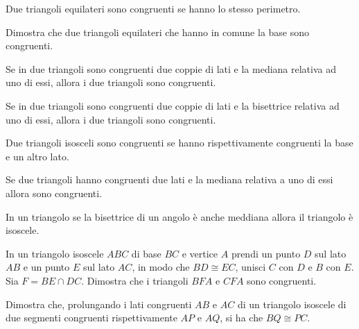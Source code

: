 \begin{multicols}{2}
\begin{esercizio}
\label{ese:2.56}
Due triangoli equilateri sono congruenti se hanno lo stesso perimetro.
\end{esercizio}

\begin{esercizio}
\label{ese:2.57}
Dimostra che due triangoli equilateri che hanno in comune la base 
sono congruenti.
\end{esercizio}

\begin{esercizio}
\label{ese:2.58}
Se in due triangoli sono congruenti due coppie di lati e la mediana 
relativa ad uno di essi, allora i due triangoli sono congruenti.
\end{esercizio}

\begin{esercizio}
\label{ese:2.59}
Se in due triangoli sono congruenti due coppie di lati e la 
bisettrice relativa ad uno di essi, allora i due triangoli sono 
congruenti.
\end{esercizio}

\begin{esercizio}
\label{ese:2.60}
Due triangoli isosceli sono congruenti se hanno rispettivamente 
congruenti la base e un altro lato.
\end{esercizio}

\begin{esercizio}
\label{ese:2.61}
Se due triangoli hanno congruenti due lati e la mediana relativa a 
uno di essi allora sono congruenti.
\end{esercizio}

\begin{esercizio}
\label{ese:2.62}
In un triangolo se la bisettrice di un angolo è anche meddiana allora 
il triangolo è isoscele.
\end{esercizio}

\begin{esercizio}
\label{ese:2.63}
In un triangolo isoscele \(ABC\) di base \(BC\) e vertice \(A\) prendi un 
punto \(D\) sul lato \(AB\) e un punto \(E\) sul lato \(AC\), in modo che 
\(BD\cong EC\), unisci \(C\) con \(D\) e \(B\) con \(E\). Sia \(F=BE\cap DC\). 
Dimostra che i triangoli \(BFA\) e \(CFA\) sono congruenti.
\end{esercizio}

\begin{esercizio}
\label{ese:2.64}
Dimostra che, prolungando i lati congruenti \(AB\) e \(AC\) di un 
triangolo isoscele di due segmenti congruenti rispettivamente \(AP\) e 
\(AQ\), si ha che \(BQ\cong PC\).
\end{esercizio}


\end{multicols}

